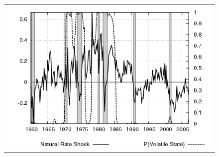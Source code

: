 \begin{figure}[ht]
\begin{center}
\begin{tabular}{c}
\includegraphics[scale=0.5]{results_cg_wlsinit/natrate.png} 
\end{tabular}
\end{center}
\end{figure}

